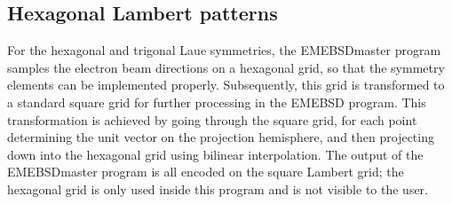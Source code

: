 \documentclass[DIV=calc, paper=letter, fontsize=11pt]{scrartcl}	 %
\begin{document}

\subsection{Hexagonal Lambert patterns \label{sec:hexagonal}}
For the hexagonal and trigonal Laue symmetries, the \textsf{EMEBSDmaster} program samples the electron beam directions on 
a hexagonal grid, so that the symmetry elements can be implemented properly.  Subsequently, this grid is transformed to a standard
square grid for further processing in the \textsf{EMEBSD} program.  This transformation is achieved by going through the square grid, 
for each point determining the unit vector on the projection hemisphere, and then projecting down into the hexagonal grid using 
bilinear interpolation.  The output of the \textsf{EMEBSDmaster} program is all encoded on the square Lambert grid; the hexagonal
grid is only used inside this program and is not visible to the user.
\end{document}
